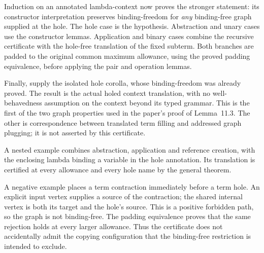 



Induction on an annotated lambda-context now proves the stronger statement:
its constructor interpretation preserves binding-freedom for \emph{any}
binding-free graph supplied at the hole. The hole case is the hypothesis.
Abstraction and unary cases use the constructor lemmas. Application and
binary cases combine the recursive certificate with the hole-free translation
of the fixed subterm. Both branches are padded to the original common maximum
allowance, using the proved padding equivalence, before applying the pair
and operation lemmas.

Finally, supply the isolated hole corolla, whose binding-freedom was already
proved. The result is the actual holed context translation, with no
well-behavedness assumption on the context beyond its typed grammar. This
is the first of the two graph properties used in the paper's proof of
Lemma~11.3. The other is correspondence between translated term filling and
addressed graph plugging; it is not asserted by this certificate.





A nested example combines abstraction, application and reference creation,
with the enclosing lambda binding a variable in the hole annotation. Its
translation is certified at every allowance and every hole name by the
general theorem.

A negative example places a term contraction immediately before a term hole.
An explicit input vertex supplies a source of the contraction; the shared
internal vertex is both its target and the hole's source. This is a positive
forbidden path, so the graph is not binding-free. The padding equivalence
proves that the same rejection holds at every larger allowance. Thus the
certificate does not accidentally admit the copying configuration that the
binding-free restriction is intended to exclude.





